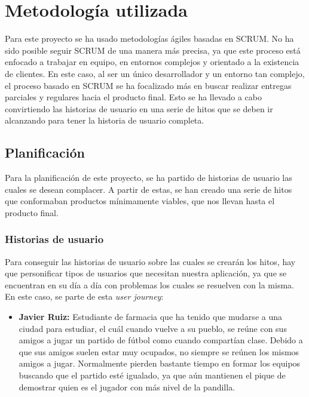 \chapter{Metodología utilizada}

Para este proyecto se ha usado metodologías ágiles basadas en SCRUM. No ha sido posible seguir SCRUM de una manera más precisa, ya que este proceso está enfocado a trabajar en
equipo, en entornos complejos y orientado a la existencia de clientes. En este caso, al ser un único desarrollador y un entorno tan complejo, el proceso basado en SCRUM se ha
focalizado más en buscar realizar entregas parciales y regulares hacia el producto final. Esto se ha llevado a cabo convirtiendo las historias de usuario en una serie de hitos
que se deben ir alcanzando para tener la historia de usuario completa.\\

\section{Planificación}

Para la planificación de este proyecto, se ha partido de historias de usuario las cuales se desean complacer. A partir de estas, se han creado una serie de hitos que conformaban productos mínimamente viables,
 que nos llevan hasta el producto final.

\subsection{Historias de usuario}

Para conseguir las historias de usuario sobre las cuales se crearán los hitos, hay que personificar tipos de usuarios que necesitan nuestra aplicación, ya que se encuentran en su día a día
con problemas los cuales se resuelven con la misma. En este caso, se parte de esta \textit{user journey}:

\newpage

\begin{itemize}
    \item \textbf{Javier Ruiz:} Estudiante de farmacia que ha tenido que mudarse a una ciudad para estudiar, el cuál cuando vuelve a su pueblo,
     se reúne con sus amigos a jugar un partido de fútbol como cuando compartían clase. Debido a que sus amigos suelen estar muy ocupados,
     no siempre se reúnen los mismos amigos a jugar. Normalmente pierden bastante tiempo en formar los equipos buscando que el partido esté igualado,
     ya que aún mantienen el pique de demostrar quien es el jugador con más nivel de la pandilla. 
    
\end{itemize}

